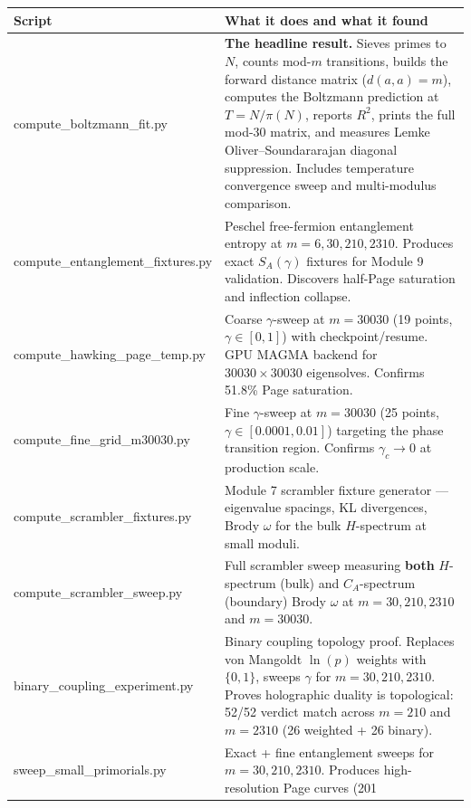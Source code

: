 \documentclass[
  11pt,
]{article}
\newcounter{none} %
\numberwithin{equation}{section}
\begin{document}
{\def\LTcaptype{none}
\small
\begin{longtable}[]{@{}
  >{\ttfamily\raggedright\arraybackslash}p{}
  >{\raggedright\arraybackslash}p{}@{}}
\toprule\noalign{}
\textnormal{Script} & \textnormal{What it does and what it found} \\
\midrule\noalign{}
\endhead
\bottomrule\noalign{}
\endlastfoot
compute\_boltzmann\_fit.py & \textbf{The headline result.}
Sieves primes to \(N\), counts mod-\(m\) transitions, builds the forward
distance matrix (\(d(a,a) = m\)), computes the Boltzmann prediction at
\(T = N/\pi(N)\), reports \(R^2\), prints the full mod-30 matrix, and
measures Lemke Oliver--Soundararajan diagonal suppression. Includes
temperature convergence sweep and multi-modulus comparison. \\
compute\_entanglement\_fixtures.py & Peschel free-fermion
entanglement entropy at \(m = 6, 30, 210, 2310\). Produces exact
\(S_A(\gamma)\) fixtures for Module 9 validation. Discovers half-Page
saturation and inflection collapse. \\
compute\_hawking\_page\_temp.py & Coarse
\(\gamma\)-sweep at \(m = 30030\) (19 points, \(\gamma \in [0, 1]\))
with checkpoint/resume. GPU MAGMA backend for \(30030\times 30030\) eigensolves.
Confirms 51.8\% Page saturation. \\
compute\_fine\_grid\_m30030.py & Fine \(\gamma\)-sweep at
\(m = 30030\) (25 points, \(\gamma \in [0.0001, 0.01]\)) targeting the
phase transition region. Confirms \(\gamma_c \to 0\) at production
scale. \\
compute\_scrambler\_fixtures.py & Module 7 scrambler fixture
generator --- eigenvalue spacings, KL divergences, Brody \(\omega\) for
the bulk \(H\)-spectrum at small moduli. \\
compute\_scrambler\_sweep.py & Full scrambler sweep measuring
\textbf{both} \(H\)-spectrum (bulk) and \(C_A\)-spectrum (boundary)
Brody \(\omega\) at \(m = 30, 210, 2310\) and \(m = 30030\). \\
binary\_coupling\_experiment.py & Binary coupling topology
proof. Replaces von Mangoldt \(\ln(p)\) weights with \(\{0,1\}\), sweeps
\(\gamma\) for \(m = 30, 210, 2310\). Proves holographic duality is
topological: 52/52 verdict match across \(m = 210\) and \(m = 2310\) (26
weighted + 26 binary). \\
sweep\_small\_primorials.py & Exact + fine entanglement sweeps
for \(m = 30, 210, 2310\). Produces high-resolution Page curves (201

\end{longtable}}
\end{document}
